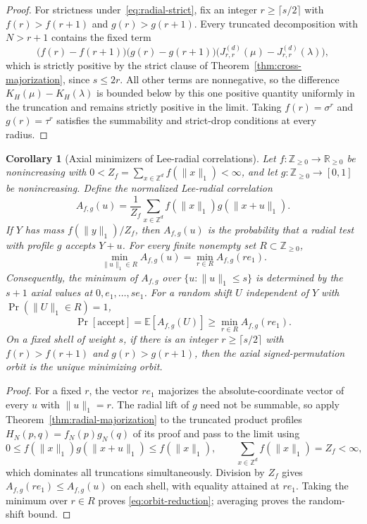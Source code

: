 \documentclass[pdflatex,sn-mathphys-num]{sn-jnl}
\theoremstyle{thmstyleone}
\newtheorem{corollary}[theorem]{Corollary}
\theoremstyle{thmstylethree}
\theoremstyle{thmstyletwo}
\newcommand{\Z}{\mathbb Z}
\newcommand{\R}{\mathbb R}
\newcommand{\E}{\mathbb E}
\begin{document}
\begin{appendices}
\begin{proof}
For strictness under~\eqref{eq:radial-strict}, fix an integer
$r\ge\lceil s/2\rceil$ with $f(r)>f(r+1)$ and $g(r)>g(r+1)$.  Every
truncated decomposition with $N>r+1$ contains the fixed term
\[
 \bigl(f(r)-f(r+1)\bigr)\bigl(g(r)-g(r+1)\bigr)
 \bigl(J_{r,r}^{(d)}(\mu)-J_{r,r}^{(d)}(\lambda)\bigr),
\]
which is strictly positive by the strict clause of
Theorem~\ref{thm:cross-majorization}, since $s\le2r$.  All other terms are
nonnegative, so the difference $K_H(\mu)-K_H(\lambda)$ is bounded below by
this one positive quantity uniformly in the truncation and remains strictly
positive in the limit.  Taking
$f(r)=\sigma^r$ and $g(r)=\tau^r$ satisfies the summability and strict-drop
conditions at every radius.
\end{proof}

\begin{corollary}[Axial minimizers of Lee-radial correlations]
\label{cor:radial-orbit-reduction}
Let $f:\Z_{\ge0}\to\R_{\ge0}$ be nonincreasing with
$0<Z_f=\sum_{x\in\Z^d}f(\|x\|_1)<\infty$, and let
$g:\Z_{\ge0}\to[0,1]$ be nonincreasing.  Define the normalized Lee-radial
correlation
\[
 A_{f,g}(u)=\frac1{Z_f}
   \sum_{x\in\Z^d}f(\|x\|_1)g(\|x+u\|_1).
\]
If $Y$ has mass $f(\|y\|_1)/Z_f$, then $A_{f,g}(u)$ is the probability that a
radial test with profile $g$ accepts $Y+u$.
For every finite nonempty set $R\subset\Z_{\ge0}$,
\begin{equation}
 \min_{\|u\|_1\in R}A_{f,g}(u)
 =\min_{r\in R}A_{f,g}(re_1).             \label{eq:orbit-reduction}
\end{equation}
Consequently, the minimum of $A_{f,g}$ over $\{u:\|u\|_1\le s\}$ is determined
by the $s+1$ axial values at $0,e_1,\ldots,se_1$.  For a random shift $U$
independent of $Y$ with $\Pr(\|U\|_1\in R)=1$,
\[
 \Pr[\mathrm{accept}]=\E[A_{f,g}(U)]
 \ge\min_{r\in R}A_{f,g}(re_1).
\]
On a fixed shell of weight $s$, if there is an integer
$r\ge\lceil s/2\rceil$ with $f(r)>f(r+1)$ and $g(r)>g(r+1)$, then the axial
signed-permutation orbit is the unique minimizing orbit.
\end{corollary}

\begin{proof}
For a fixed $r$, the vector $re_1$ majorizes the absolute-coordinate vector
of every $u$ with $\|u\|_1=r$.  The radial lift of $g$ need not be summable,
so apply Theorem~\ref{thm:radial-majorization} to the truncated product
profiles $H_N(p,q)=f_N(p)g_N(q)$ of its proof and pass to the limit using
\[
 0\le f(\|x\|_1)g(\|x+u\|_1)\le f(\|x\|_1),\qquad
 \sum_{x\in\Z^d}f(\|x\|_1)=Z_f<\infty,
\]
which dominates all truncations simultaneously.  Division by
$Z_f$ gives
$A_{f,g}(re_1)\le A_{f,g}(u)$ on each shell, with equality attained at
$re_1$.  Taking the minimum over $r\in R$ proves
\eqref{eq:orbit-reduction}; averaging proves the random-shift bound.


\end{proof}
\end{appendices}
\end{document}
